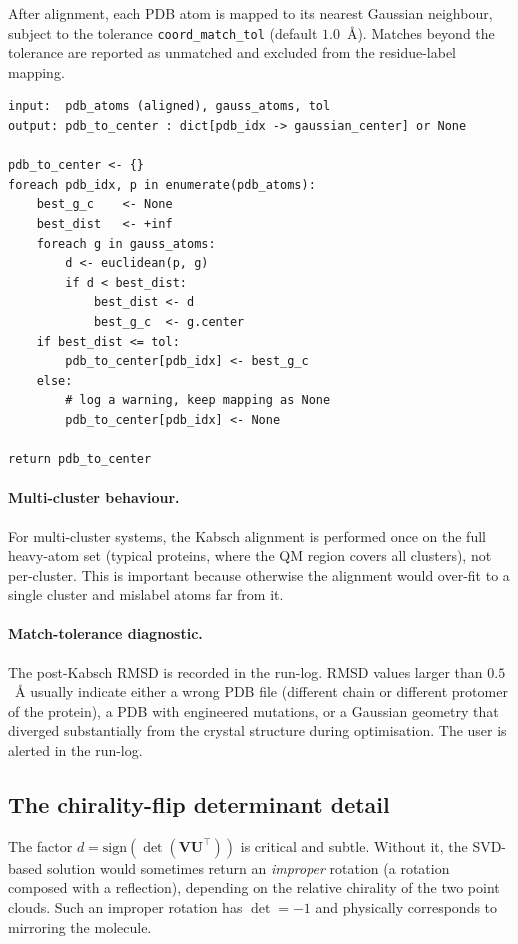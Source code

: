 \documentclass[10pt,a4paper,twoside]{article}
\newcommand{\Umat}{\mathbf{U}}
\newcommand{\Vmat}{\mathbf{V}}
\newcommand{\cfgkey}[1]{\texttt{#1}}
\begin{document}
After alignment, each PDB atom is mapped to its nearest Gaussian
neighbour, subject to the tolerance \cfgkey{coord\_match\_tol}
(default $1.0$~\AA{}). Matches beyond the tolerance are reported as
unmatched and excluded from the residue-label mapping.

\begin{lstlisting}[style=pseudo,
  caption={Nearest-neighbour mapping post-Kabsch.}]
input:  pdb_atoms (aligned), gauss_atoms, tol
output: pdb_to_center : dict[pdb_idx -> gaussian_center] or None

pdb_to_center <- {}
foreach pdb_idx, p in enumerate(pdb_atoms):
    best_g_c    <- None
    best_dist   <- +inf
    foreach g in gauss_atoms:
        d <- euclidean(p, g)
        if d < best_dist:
            best_dist <- d
            best_g_c  <- g.center
    if best_dist <= tol:
        pdb_to_center[pdb_idx] <- best_g_c
    else:
        # log a warning, keep mapping as None
        pdb_to_center[pdb_idx] <- None

return pdb_to_center
\end{lstlisting}

\paragraph{Multi-cluster behaviour.}
For multi-cluster systems, the Kabsch alignment is performed once
on the full heavy-atom set (typical proteins, where the QM region
covers all clusters), not per-cluster. This is important because
otherwise the alignment would over-fit to a single cluster and
mislabel atoms far from it.

\paragraph{Match-tolerance diagnostic.}
The post-Kabsch RMSD is recorded in the run-log. RMSD values larger
than $0.5$~\AA{} usually indicate either a wrong PDB file (different
chain or different protomer of the protein), a PDB with engineered
mutations, or a Gaussian geometry that diverged substantially from
the crystal structure during optimisation. The user is alerted in
the run-log.

\subsection{The chirality-flip determinant detail}

The factor $d = \text{sign}(\det(\Vmat \Umat^\top))$ is critical
and subtle. Without it, the SVD-based solution would sometimes
return an \emph{improper} rotation (a rotation composed with a
reflection), depending on the relative chirality of the two point
clouds. Such an improper rotation has $\det = -1$ and physically
corresponds to mirroring the molecule.
\end{document}
